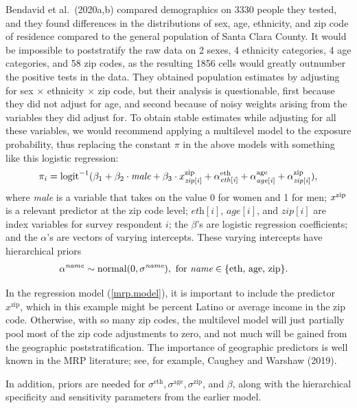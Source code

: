\documentclass[11pt]{article}
\begin{document}
Bendavid et al.\ (2020a,b) compared demographics on 3330 people they tested, and they found differences in the distributions of sex, age, ethnicity, and zip code of residence compared to the general population of Santa Clara County. It would be impossible to poststratify the raw data on 2 sexes, 4 ethnicity categories,  4 age categories, and 58 zip codes, as the resulting 1856 cells would greatly outnumber the positive tests in the data.  They obtained population estimates by adjusting for sex $\times$ ethnicity $\times$ zip code, but their analysis is questionable, first because they did not adjust for age, and second because of noisy weights arising from the variables they did adjust for.
To obtain stable estimates while adjusting for all these variables, we would recommend applying a multilevel model to the exposure probability, thus replacing the constant $\pi$ in the above models with something like this logistic regression:
\begin{equation}\label{mrp.model}
\pi_i = \mbox{logit}^{-1}(\beta_1 + \beta_2 \cdot \mbox{\it male} + \beta_3 \cdot x^{\textrm{zip}}_{\it zip[i]} + \alpha^{\textrm{eth}}_{\it eth[i]} + \alpha^{\textrm{age}}_{\it age[i]} + \alpha^{\textrm{zip}}_{\it zip[i]}),
\end{equation}
where {\it male} is a variable that takes on the value 0 for women and 1 for men; $x^{\rm zip}$ is a relevant predictor at the zip code level; $\textit{eth}[i]$, $\textit{age}[i]$, and $\textit{zip}[i]$ are index variables for survey respondent $i$; the $\beta$'s are logistic regression coefficients; and the $\alpha$'s are vectors of varying intercepts.  These varying intercepts have hierarchical priors
\begin{align*}
  \alpha^{\it name} &\sim \mbox{normal}(0, \sigma^{\textit{name}}), \ \textrm{for} \ \textit{name} \in \{ \textrm{eth, age, zip} \}.
\end{align*}

In the regression model (\ref{mrp.model}), it is important to include the predictor $x^{\textrm{zip}}$, which in this example might be percent Latino or average income in the zip code.  Otherwise, with so many zip codes, the multilevel model will just partially pool most of the zip code adjustments to zero, and not much will be gained from the geographic poststratification.  The importance of geographic predictors is well known in the MRP literature; see, for example, Caughey and Warshaw (2019).

In addition, priors are needed for $\sigma^{\textrm{eth}}, \sigma^{\textrm{age}}, \sigma^{\textrm{zip}}$, and $\beta$, along with the hierarchical specificity and sensitivity parameters from the earlier model.
\end{document}
